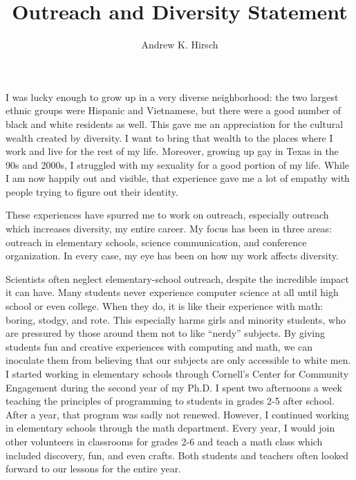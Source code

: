 \documentclass{article}
\author{Andrew K. Hirsch}
\title{Outreach and Diversity Statement}
\date{}
\theoremstyle{definition}
\begin{document}
\maketitle

I was lucky enough to grow up in a very diverse neighborhood: the two largest ethnic groups were Hispanic and Vietnamese, but there were a good number of black and white residents as well.
This gave me an appreciation for the cultural wealth created by diversity.
I want to bring that wealth to the places where I work and live for the rest of my life.
Moreover, growing up gay in Texas in the 90s and 2000s, I struggled with my sexuality for a good portion of my life.
While I am now happily out and visible, that experience gave me a lot of empathy with people trying to figure out their identity.

These experiences have spurred me to work on outreach, especially outreach which increases diversity, my entire career.
My focus has been in three areas: outreach in elementary schools, science communication, and conference organization.
In every case, my eye has been on how my work affects diversity.

Scientists often neglect elementary-school outreach, despite the incredible impact it can have.
Many students never experience computer science at all until high school or even college.
When they do, it is like their experience with math: boring, stodgy, and rote.
This especially harms girls and minority students, who are pressured by those around them not to like ``nerdy'' subjects.
By giving students fun and creative experiences with computing and math, we can inoculate them from believing that our subjects are only accessible to white men.
I started working in elementary schools through Cornell's Center for Community Engagement during the second year of my Ph.D.
I spent two afternoons a week teaching the principles of programming to students in grades 2-5 after school.
After a year, that program was sadly not renewed.
However, I continued working in elementary schools through the math department.
Every year, I would join other volunteers in classrooms for grades 2-6 and teach a math class which included discovery, fun, and even crafts.
Both students and teachers often looked forward to our lessons for the entire year.
\end{document}
